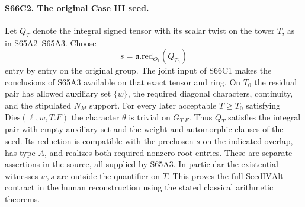 \paragraph{S66C2. The original Case III seed.}
Let $Q_T$ denote the integral signed tensor with its scalar twist
on the tower $T$, as in S65A2--S65A3. Choose
\[
              s = \mathfrak a.\mathrm{red}_{O_1}(Q_{T_0})
\]
entry by entry on the original group. The joint input of S66C1
makes the conclusions of S65A3 available on that exact tensor and
ring. On $T_0$ the residual pair has allowed auxiliary set $\{w\}$,
the required diagonal characters, continuity, and the stipulated
$N_M$ support. For every later acceptable $T\ge T_0$ satisfying
$\mathrm{Dies}(\ell,w,T.F)$ the character $\theta$ is trivial on
$G_{T.F}$. Thus $Q_T$ satisfies the integral pair with empty
auxiliary set and the weight and automorphic clauses of the seed.
Its reduction is compatible with the prechosen $s$ on the indicated
overlap, has type $A$, and realizes both required nonzero root
entries. These are separate assertions in the source, all supplied
by S65A3. In particular the existential witnesses $w,s$ are
outside the quantifier on $T$. This proves the full
$\mathrm{SeedIVAlt}$ contract in the human reconstruction using
the stated classical arithmetic theorems.
